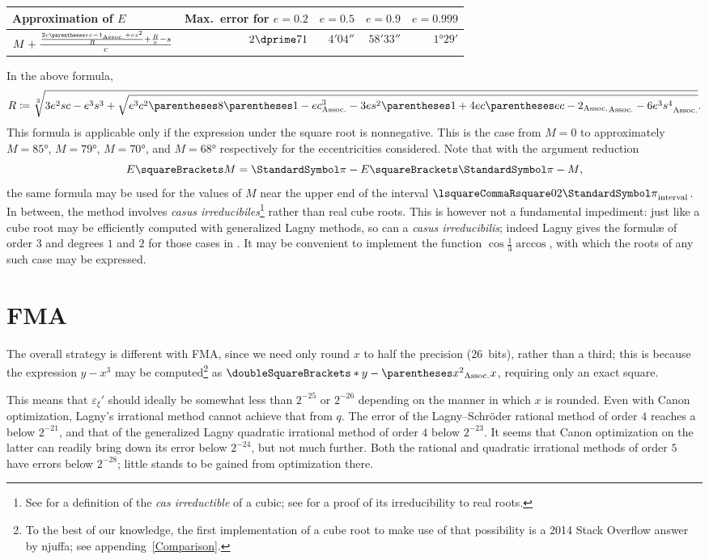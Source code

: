 ﻿\documentclass[10pt, a4paper, twoside]{basestyle}
\newcommand{\round}[1]{\doubleSquareBrackets*{#1}}
\begin{document}
\begin{center}
\begin{tabular}{lrrrr}
Approximation of $E$ & Max.~error for $e=0.2$ & $e=0.5$ & $e=0.9$ & $e=0.999$ \\
\hline
$M+\frac{\frac{2c\pa{ec-1}+es^2}{R}+\frac{R}{e}-s}{c}$
 & $2\dprime\llap.71$ & $4'04\dprime$ & $58'33\dprime$& $1°29'$
\end{tabular}
\end{center}
In the above formula,\[
R\DefineAs\sqrt[3]{3e^2sc-e^3s^3+\sqrt{e^3c^2\pa{8\pa{1-ec}^3-3es^2\pa{1+4ec\pa{ec-2}}-6e^3s^4}}}\text.
\]
This formula is applicable only if the expression under the square root is nonnegative.
This is the case from $M=0$ to approximately $M=85°$, $M=79°$, $M=70°$, and $M=68°$
respectively for the eccentricities considered. Note that with the argument reduction\[
E\of{M}=\Pi-E\of{\Pi-M}\text,\]
the same formula may be used for the values of $M$ near the upper end of the interval $\intclos{0}{2\Pi}$.
In between, the method involves 
\emph{casus irreducibiles}\footnote{See \cite[469]{FantetdeLagny1697} for a definition
of the \emph{cas irreductible} of a cubic; see \cite[125\psqq]{Wantzel1843} for a proof of its irreducibility to real
roots.} rather than real cube roots.
This is however not a fundamental impediment: just like a cube root may be efficiently computed with generalized Lagny
methods, so can a \emph{casus irreducibilis}; indeed Lagny gives the formulæ of order $3$ and degrees $1$ and $2$ for those
cases in \cite[41]{FantetdeLagny1692}. It may be convenient to implement the function
$\cos\frac{1}{3}\arccos$, with which the roots of any such case may be expressed.

\section{FMA}
\label{FMA}
The overall strategy is different with FMA, since we need only round $x$ to half the precision ($26$~bits),
rather than a third; this is because the expression $y-x^3$ may be computed\footnote{To the best of our knowledge,
the first implementation of a cube root to make use of that possibility is a 2014 Stack Overflow answer by njuffa; see
appending~\ref{Comparison}.}
as $\round{y-\pa{x^2}x}$, requiring only an exact square.

This means that $ε_ξ'$ should ideally be somewhat less than $2^{-25}$ or $2^{-26}$ depending on
the manner in which $x$ is rounded. Even with Canon optimization, Lagny's irrational method cannot
achieve that from $q$. The error of the Lagny--Schröder rational method of order $4$ reaches a below $2^{-21}$,
and that of the generalized Lagny quadratic irrational method of order $4$ below $2^{-23}$.
It seems that Canon optimization on the latter can readily bring down its error below $2^{-24}$, but not much
further.
Both the rational and quadratic irrational methods of order $5$ have errors below $2^{-28}$; little stands to be gained
from optimization there.
\end{document}
